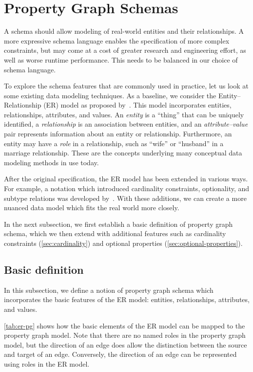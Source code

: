\documentclass{article}
\theoremstyle{definition}
\begin{document}
\section{Property Graph Schemas}

A schema should allow modeling of real-world entities and their relationships. A more expressive schema language enables the specification of more complex constraints, but may come at a cost of greater research and engineering effort, as well as worse runtime performance. This needs to be balanced in our choice of schema language.

To explore the schema features that are commonly used in practice, let us look at some existing data modeling techniques. As a baseline, we consider the Entity--Relationship (ER) model as proposed by~\citet{chen1976entity}. This model incorporates entities, relationships, attributes, and values. An \emph{entity} is a ``thing'' that can be uniquely identified, a \emph{relationship} is an association between entities, and an \emph{attribute--value} pair represents information about an entity or relationship. Furthermore, an entity may have a \emph{role} in a relationship, such as ``wife'' or ``husband'' in a marriage relationship. These are the concepts underlying many conceptual data modeling methods in use today.

After the original specification, the ER model has been extended in various ways. For example, a notation which introduced cardinality constraints, optionality, and subtype relations was developed by~\citet{barker1990entity}. With these additions, we can create a more nuanced data model which fits the real world more closely.

In the next subsection, we first establish a basic definition of property graph schema, which we then extend with additional features such as cardinality constraints (\autoref{sec:cardinality}) and optional properties (\autoref{sec:optional-properties}).

\subsection{Basic definition}

In this subsection, we define a notion of property graph schema which incorporates the basic features of the ER model: entities, relationships, attributes, and values.

\autoref{tab:er-pg} shows how the basic elements of the ER model can be mapped to the property graph model. Note that there are no named roles in the property graph model, but the direction of an edge does allow the distinction between the source and target of an edge. Conversely, the direction of an edge can be represented using roles in the ER model.
\end{document}
